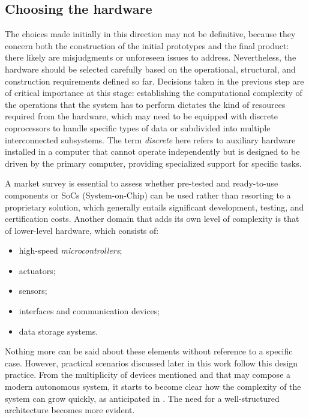 \subsection{Choosing the hardware}
\label{sec:design_challenges_hardware}
The choices made initially in this direction may not be definitive, because they concern both the construction of the initial prototypes and the final product: there likely are misjudgments or unforeseen issues to address. Nevertheless, the hardware should be selected carefully based on the operational, structural, and construction requirements defined so far. Decisions taken in the previous step are of critical importance at this stage: establishing the computational complexity of the operations that the system has to perform dictates the kind of resources required from the hardware, which may need to be equipped with discrete coprocessors to handle specific types of data or subdivided into multiple interconnected subsystems. The term \emph{discrete} here refers to auxiliary hardware installed in a computer that cannot operate independently but is designed to be driven by the primary computer, providing specialized support for specific tasks.

A market survey is essential to assess whether pre-tested and ready-to-use components or SoCs (System-on-Chip) can be used rather than resorting to a proprietary solution, which generally entails significant development, testing, and certification costs. Another domain that adds its own level of complexity is that of lower-level hardware, which consists of:
\begin{itemize}
    \item high-speed \emph{microcontrollers};
    \item actuators;
    \item sensors;
    \item interfaces and communication devices;
    \item data storage systems.
\end{itemize}

Nothing more can be said about these elements without reference to a specific case. However, practical scenarios discussed later in this work follow this design practice. From the multiplicity of devices mentioned and that may compose a modern autonomous system, it starts to become clear how the complexity of the system can grow quickly, as anticipated in . The need for a well-structured architecture becomes more evident.

